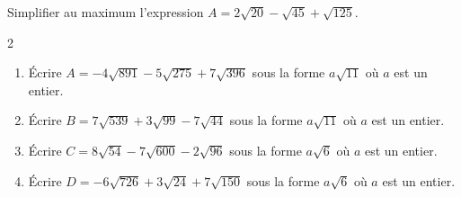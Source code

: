 {\begin{Exercice}
Simplifier au maximum l’expression $A = 2\sqrt{20} - \sqrt{45} + \sqrt{125}$.
\end{Exercice}



\begin{Exercice}
\leavevmode\vspace{-\baselineskip}
\vspace{-0.5cm}
\begin{multicols}{2}
\begin{enumerate}[itemsep=1em]
	\item \begin{minipage}[t]{\linewidth} Écrire $A=-4\sqrt{891} -5\sqrt{275} +7\sqrt{396}$ sous la forme $a\sqrt{11}$ où $a$ est un entier. \end{minipage}
	\item \begin{minipage}[t]{\linewidth} Écrire $B=7\sqrt{539} +3\sqrt{99} -7\sqrt{44}$ sous la forme $a\sqrt{11}$ où $a$ est un entier. \end{minipage}
	\item \begin{minipage}[t]{\linewidth} Écrire $C=8\sqrt{54} -7\sqrt{600} -2\sqrt{96}$ sous la forme $a\sqrt{6}$ où $a$ est un entier. \end{minipage}
	\item \begin{minipage}[t]{\linewidth} Écrire $D=-6\sqrt{726} +3\sqrt{24} +7\sqrt{150}$ sous la forme $a\sqrt{6}$ où $a$ est un entier. \end{minipage}
\end{enumerate}
\end{multicols}
\end{Exercice}

}

